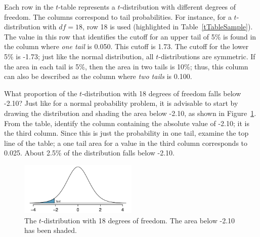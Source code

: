 Each row in the $t$-table represents a $t$-distribution with different degrees of freedom. The columns correspond to tail probabilities. For instance, for a $t$-distribution with $df=18$, row 18 is used (highlighted in Table~\ref{tTableSample}). The value in this row that identifies the cutoff for an upper tail of 5\% is found in the column where \emph{one tail} is 0.050. This cutoff is 1.73. The cutoff for the lower 5\% is -1.73; just like the normal distribution, all $t$-distributions are symmetric. If the area in each tail is 5\%, then the area in two tails is 10\%; thus, this column can also be described as the column where \emph{two tails} is 0.100.


\begin{example}{What proportion of the $t$-distribution with 18 degrees of freedom falls below -2.10?}
Just like for a normal probability problem, it is advisable to start by drawing the distribution and shading the area below -2.10, as shown in Figure~\ref{tDistDF18LeftTail2Point10}. From the table, identify the column containing the absolute value of -2.10; it is the third column. Since this is just the probability in one tail, examine the top line of the table; a one tail area for a value in the third column corresponds to 0.025. About 2.5\% of the distribution falls below -2.10.	

\begin{figure}[h]
\centering
\includegraphics[width=0.5\textwidth]{ch_inference_for_means_oi_biostat/figures/tDistDF18LeftTail2Point10/tDistDF18LeftTail2Point10}
\caption{The $t$-distribution with 18 degrees of freedom. The area below -2.10 has been shaded.}
\label{tDistDF18LeftTail2Point10}
\end{figure}

\end{example}

\newpage

